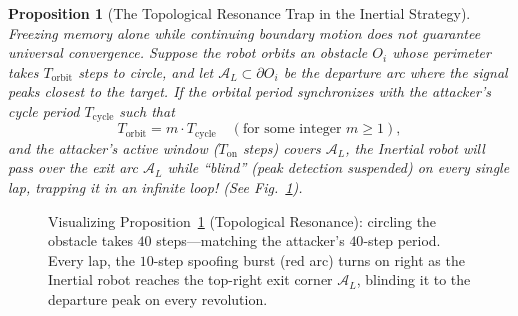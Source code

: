 \documentclass[11pt, a4paper]{article}
\newtheorem{proposition}{Proposition}
\begin{document}
\begin{proposition}[The Topological Resonance Trap in the Inertial Strategy]
\label{prop:resonance}
Freezing memory alone while continuing boundary motion does not guarantee universal convergence. Suppose the robot orbits an obstacle $O_i$ whose perimeter takes $T_{\text{orbit}}$ steps to circle, and let $\mathcal{A}_L \subset \partial O_i$ be the departure arc where the signal peaks closest to the target. If the orbital period synchronizes with the attacker's cycle period $T_{\text{cycle}}$ such that
\begin{equation*}
    T_{\text{orbit}} = m \cdot T_{\text{cycle}} \quad (\text{for some integer } m \ge 1),
\end{equation*}
and the attacker's active window ($T_{\text{on}}$ steps) covers $\mathcal{A}_L$, the Inertial robot will pass over the exit arc $\mathcal{A}_L$ while ``blind'' (peak detection suspended) on every single lap, trapping it in an infinite loop! (See Fig.~\ref{fig:resonance_diagram}).
\end{proposition}

\begin{figure}[H]
\centering
{}
\caption{Visualizing Proposition~\ref{prop:resonance} (Topological Resonance): circling the obstacle takes $40$ steps—matching the attacker's $40$-step period. Every lap, the $10$-step spoofing burst (red arc) turns on right as the Inertial robot reaches the top-right exit corner $\mathcal{A}_L$, blinding it to the departure peak on every revolution.}
\label{fig:resonance_diagram}
\end{figure}
\end{document}
